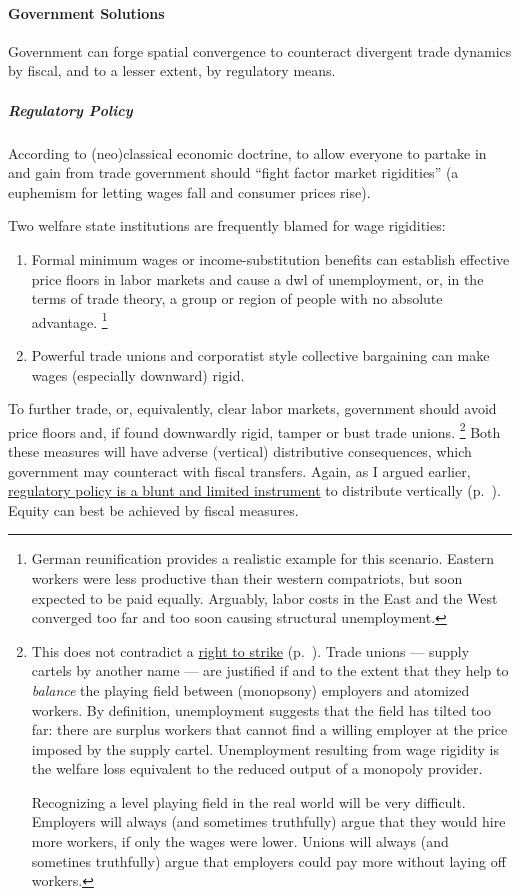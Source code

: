 \paragraph{Government Solutions}
Government can forge spatial convergence to counteract divergent trade dynamics by fiscal, and to a lesser extent, by regulatory means.

\subparagraph{Regulatory Policy}
According to (neo)classical economic doctrine, to allow everyone to partake in and gain from trade government should ``fight factor market rigidities'' (a euphemism for letting wages fall and consumer prices rise).

Two welfare state institutions are frequently blamed for wage rigidities:
\begin{enumerate}
	\item Formal minimum wages or income-substitution benefits can establish effective price floors in labor markets and cause a \gls{dwl} of unemployment, or, in the terms of trade theory, a group or region of people with no absolute advantage.
	\footnote{
		German reunification provides a realistic example for this scenario.
		Eastern workers were less productive than their western compatriots, but soon expected to be paid equally.
		Arguably, labor costs in the East and the West converged too far and too soon causing structural unemployment.
	}

	\item Powerful trade unions and corporatist style collective bargaining can make wages (especially downward) rigid.
\end{enumerate}

To further trade, or, equivalently, clear labor markets, government should avoid price floors and, if found downwardly rigid, tamper or bust trade unions.
\footnote{
	This does not contradict a \hyperref[sec:redistributive-policy]{right to strike} (p.~\pageref{sec:redistributive-policy}).
	Trade unions --- supply cartels by another name --- are justified if and to the extent that they help to \emph{balance} the playing field between (monopsony) employers and atomized workers.
	By definition, unemployment suggests that the field has tilted too far:
	there are surplus workers that cannot find a willing employer at the price imposed by the supply cartel.
	Unemployment resulting from wage rigidity is the welfare loss equivalent to the reduced output of a monopoly provider.

	Recognizing a level playing field in the real world will be very difficult.
	Employers will always (and sometimes truthfully) argue that they would hire more workers, if only the wages were lower.
	Unions will always (and sometines truthfully) argue that employers could pay more without laying off workers.
}
Both these measures will have adverse (vertical) distributive consequences, which government may counteract with fiscal transfers.
Again, as I argued earlier, \hyperref[sec:redistributive-policy]{regulatory policy is a blunt and limited instrument} to distribute vertically (p.~\pageref{sec:redistributive-policy}).
Equity can best be achieved by fiscal measures.

